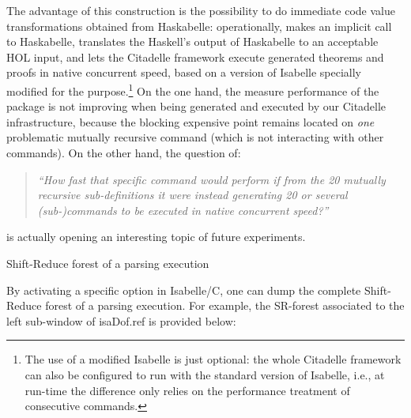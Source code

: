 \begin{isabellebody}
\begin{isamarkuptext}
The advantage of this construction is the possibility to do immediate code value transformations
obtained from Haskabelle: operationally,  makes an
implicit call to Haskabelle, translates the Haskell's output of Haskabelle to an acceptable HOL
input, and lets the Citadelle framework execute generated theorems and proofs in native concurrent
speed, based on a version of Isabelle specially modified for the purpose.\footnote{The use
  of a modified Isabelle is just optional: the whole Citadelle framework can also be configured to
  run with the standard version of Isabelle, i.e., at run-time the difference only relies on the
  performance treatment of consecutive commands.} On the one hand, the measure performance
of the  package is not improving when being generated and
executed by our Citadelle infrastructure, because the blocking expensive point remains located on
\emph{one} problematic mutually recursive 
command (which is not interacting with other commands). On the other hand, the question
of: \begin{quote}\emph{``How fast that specific 
  command would perform if from the 20 mutually recursive sub-definitions it were instead generating
  20 or several (sub-)commands to be executed in native concurrent speed?''}\end{quote} is
  actually opening an interesting topic of future experiments.%
\end{isamarkuptext}\isamarkuptrue%
%
\begin{isamarkupsubsection*}%
[label = {forest},type = {scholarly_paper.technical}, args={label = {forest},type = {scholarly_paper.technical}, Isa_COL.text_element.level = {}, Isa_COL.text_element.referentiable = {False}, Isa_COL.text_element.variants = {{STR ''outline'', STR ''document''}}, scholarly_paper.text_section.main_author = {}, scholarly_paper.text_section.fixme_list = {}, Isa_COL.text_element.level = {}, scholarly_paper.technical.definition_list = {}}]Shift-Reduce forest of a parsing execution%
\end{isamarkupsubsection*}\isamarkuptrue%
%
\begin{isamarkuptext}%
By activating a specific option in Isabelle/C, one can dump the complete Shift-Reduce
forest of a parsing execution. For example, the SR-forest associated to the left sub-window of
\csname isaDof.ref is provided below:
\begin{isar}

\end{isar}
\end{isamarkuptext}
\end{isabellebody}
